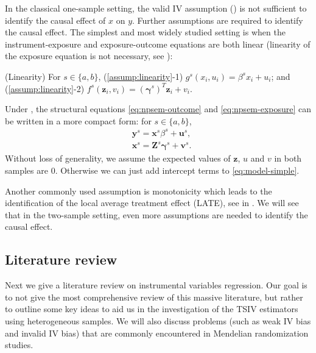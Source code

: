 \documentclass[preprint]{imsart}
\begin{document}
In the classical one-sample setting, the valid IV assumption
() is not sufficient to identify the
causal effect of $x$ on $y$. Further assumptions are required to
identify the causal effect. The simplest and most widely studied
setting is when the instrument-exposure and exposure-outcome equations
are both linear (linearity of the exposure equation is not necessary,
see ):
\begin{assumption} \label{assump:linearity}
  (Linearity) For $s \in \{a,b\}$, (\ref{assump:linearity}-1) $g^s(x_i,u_i) = \beta^s x_i +
  u_i$; and (\ref{assump:linearity}-2) $f^s(\mathbf{z}_i,v_i) = (\bm{\gamma}^s)^T \mathbf{z}_i + v_i$.
\end{assumption}
Under , the structural equations
\eqref{eq:npsem-outcome} and \eqref{eq:npsem-exposure} can be written in a more
compact form: for $s\in\{a,b\}$,
\begin{equation}
  \label{eq:model-simple}
  \begin{split}
    &\mathbf{y}^s = \mathbf{x}^s \beta^s + \mathbf{u}^s, \\
    &\mathbf{x}^s = \mathbf{Z}^s \bm{\gamma}^s + \mathbf{v}^s.
  \end{split}
\end{equation}
Without loss of generality, we assume the expected values of
$\mathbf{z}$, $u$ and $v$ in both samples are $0$. Otherwise we can just
add intercept terms to \eqref{eq:model-simple}.

Another commonly used assumption is monotonicity which leads to the
identification of the local average treatment effect (LATE), see
 in . We will see
that in the two-sample setting, even more assumptions are needed to
identify the causal effect.

\subsection{Literature review}
\label{sec:literature-review}

Next we give a literature review on instrumental variables
regression. Our goal is to not give the most comprehensive review of
this massive literature, but rather to outline some key ideas to aid
us in the investigation of the TSIV estimators using heterogeneous
samples. We will also discuss problems (such as weak IV bias
and invalid IV bias) that are commonly encountered
in Mendelian randomization studies.
\end{document}
